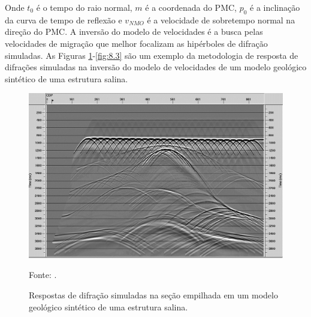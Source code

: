 Onde $t_0$ é o tempo do raio normal, $m$ é a coordenada do PMC, $p_0$ é a inclinação da curva de tempo de reflexão e $v_{NMO}$
é a velocidade de sobretempo normal na direção do PMC. A inversão do modelo de velocidades
é a busca pelas velocidades de migração que melhor focalizam as hipérboles de difração simuladas.
As Figuras \ref{fig:8.1}-\ref{fig:8.3} são um exemplo da metodologia de resposta de difrações simuladas na inversão do
modelo de velocidades de um modelo geológico sintético de uma estrutura salina.

\begin{figure}[htb]
\caption{Respostas de difração simuladas na seção empilhada em um modelo geológico sintético de uma estrutura salina.}
\begin{center}
\includegraphics[scale=0.30]{images/simula_diff.png}
\vspace{-0.3cm}
\end{center}
\begin{center}
 Fonte: \cite{diffractions}.
\end{center}
\label{fig:8.1}
\end{figure}

